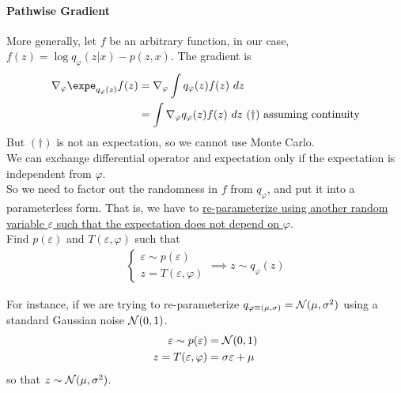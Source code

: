 \documentclass{article}
\begin{document}
	\paragraph{Pathwise Gradient} More generally, let $f$ be an arbitrary function, in our case, $f(z) = \log q_\varphi(z|x) - p(z, x)$. The gradient is
	\begin{align}
		\nabla_\varphi \expe_{q_\varphi(z)} f(z) &= \nabla_\varphi \int q_\varphi(z) f(z)\ dz \\
		&= \int \nabla_\varphi q_\varphi(z) f(z)\ dz\ (\dagger)\tx{ assuming continuity}
	\end{align}
	But $(\dagger)$ is not an expectation, so we cannot use Monte Carlo. \\
	We can exchange differential operator and expectation only if the expectation is independent from $\varphi$. \\
	So we need to factor out the randomness in $f$ from $q_\varphi$, and put it into a parameterless form. That is, we have to
	\ul{re-parameterize using another random variable $\varepsilon$ such that the expectation does not depend on $\varphi$}. \\
	Find $p(\varepsilon)$ and $T(\varepsilon, \varphi)$ such that
	\begin{align}
		\begin{cases}
			\varepsilon \sim p(\varepsilon) \\ 
			z = T(\varepsilon, \varphi)
		\end{cases}
		\implies z \sim q_\varphi(z)
	\end{align}
	
	\begin{example}
		For instance, if we are trying to re-parameterize $q_{\varphi\equiv(\mu, \sigma)} = \mathcal{{N}}(\mu, \sigma^2)$ using a standard Gaussian noise $\mathcal{{N}}(0, 1)$.
		\begin{align}
			\varepsilon \sim p(\varepsilon) &= \mathcal{{N}}(0, 1) \\
			z = T(\varepsilon, \varphi) &= \sigma \varepsilon + \mu
		\end{align}
		so that $z \sim \mathcal{{N}}(\mu, \sigma^2)$.
	\end{example}
	
\end{document}
